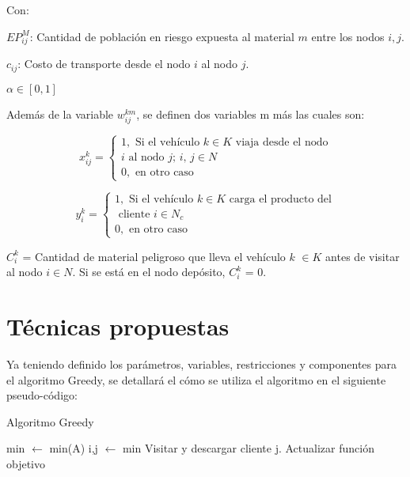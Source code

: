 \documentclass[conference]{IEEEtran}
\begin{document}
Con:

$EP^M_{ij}$: Cantidad de poblaci\'on en riesgo expuesta al material $m$ entre los nodos $i, j$.

$c_{ij}$: Costo de transporte desde el nodo $i$ al nodo $j$.

$\alpha \in [0,1]$

Adem\'as de la variable $w^{km}_{ij}$, se definen dos variables m m\'as las cuales son:

\begin{equation*}
        x^{k}_{ij} =     
    \begin{cases}
      1, \text{ Si el  veh\'iculo $k$} \in \text{$K$ viaja desde el nodo}  \\ \text{$i$ al nodo $j$; $i$, $j$} \in \text{$N$}
      \\
      0, \text{ en otro caso}
    \end{cases}
    \end{equation*}

\begin{equation*}
        y^{k}_{i} =     
    \begin{cases}
      1, \text{ Si el  veh\'iculo $k$} \in \text{$K$ carga el producto del}  \\ \text{ cliente $i$} \in \text{$N_c$}
      \\
      0, \text{ en otro caso}
    \end{cases}
    \end{equation*}
    

$C^{k}_{i}$ = Cantidad de material peligroso que lleva el veh\'iculo $k$  $\in K$ antes de visitar al nodo $i \in N$. Si se est\'a en el nodo dep\'osito,  $C^{k}_{i}$ = 0. 
\\

\section{T\'ecnicas propuestas}

Ya teniendo definido los par\'ametros, variables, restricciones y componentes para el algoritmo Greedy, se detallar\'a el c\'omo se utiliza el algoritmo en el siguiente pseudo-c\'odigo:

\begin{algorithm}
\caption{Algoritmo Greedy}
\begin{algorithmic}[1]
        \STATE min $\gets$ min(A)
        \STATE i,j $\gets$ min
                \STATE Visitar y descargar cliente j.
                \STATE Actualizar funci\'on objetivo
            \ENDIF
        \ENDIF
    \ENDFOR
\ENDWHILE
\end{algorithmic}
\end{algorithm}
\end{document}
